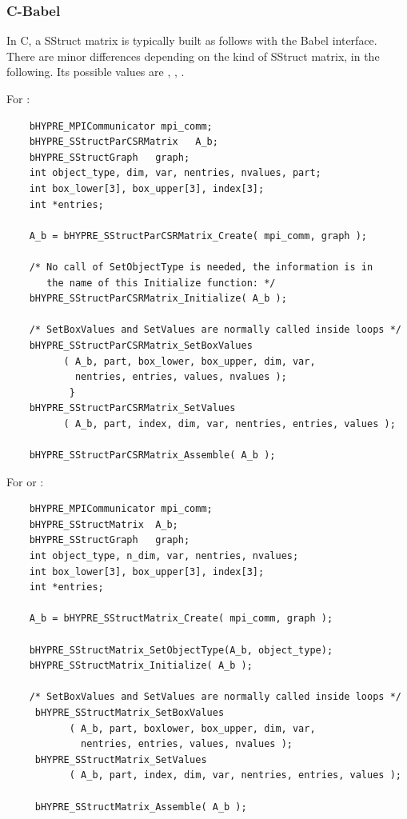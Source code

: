 \subsubsection{C-Babel}

In C, a SStruct  matrix is typically built as follows with
the Babel interface.  There are minor differences depending on the
kind of SStruct matrix,  in the following.  Its possible
values are , , .

For :
\begin{verbatim}
    bHYPRE_MPICommunicator mpi_comm;
    bHYPRE_SStructParCSRMatrix   A_b;
    bHYPRE_SStructGraph   graph;
    int object_type, dim, var, nentries, nvalues, part;
    int box_lower[3], box_upper[3], index[3];
    int *entries;

    A_b = bHYPRE_SStructParCSRMatrix_Create( mpi_comm, graph );

    /* No call of SetObjectType is needed, the information is in
       the name of this Initialize function: */
    bHYPRE_SStructParCSRMatrix_Initialize( A_b );

    /* SetBoxValues and SetValues are normally called inside loops */
    bHYPRE_SStructParCSRMatrix_SetBoxValues
          ( A_b, part, box_lower, box_upper, dim, var,
            nentries, entries, values, nvalues );
           }
    bHYPRE_SStructParCSRMatrix_SetValues
          ( A_b, part, index, dim, var, nentries, entries, values );

    bHYPRE_SStructParCSRMatrix_Assemble( A_b );
\end{verbatim}


For  or :
\begin{verbatim}
    bHYPRE_MPICommunicator mpi_comm;
    bHYPRE_SStructMatrix  A_b;
    bHYPRE_SStructGraph   graph;
    int object_type, n_dim, var, nentries, nvalues;
    int box_lower[3], box_upper[3], index[3];
    int *entries;

    A_b = bHYPRE_SStructMatrix_Create( mpi_comm, graph );

    bHYPRE_SStructMatrix_SetObjectType(A_b, object_type);
    bHYPRE_SStructMatrix_Initialize( A_b );

    /* SetBoxValues and SetValues are normally called inside loops */
     bHYPRE_SStructMatrix_SetBoxValues
           ( A_b, part, boxlower, box_upper, dim, var,
             nentries, entries, values, nvalues );
     bHYPRE_SStructMatrix_SetValues
           ( A_b, part, index, dim, var, nentries, entries, values );

     bHYPRE_SStructMatrix_Assemble( A_b );
\end{verbatim}


